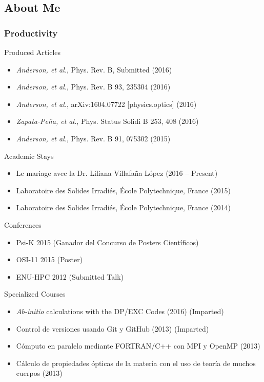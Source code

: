 \documentclass{beamer}
\begin{document}

\subsection{About Me}

\begin{frame}
\frametitle{Productivity}
\begin{block}{Produced Articles}
\begin{itemize}
\item \emph{Anderson, et al.}, Phys. Rev. B, Submitted (2016)
\item \emph{Anderson, et al.}, Phys. Rev. B 93, 235304 (2016)
\item \emph{Anderson, et al.}, arXiv:1604.07722 [physics.optics] (2016)
\item \emph{Zapata-Pe\~na, et al.}, Phys. Status Solidi B 253, 408 (2016) %
\item \emph{Anderson, et al.}, Phys. Rev. B 91, 075302 (2015)
\end{itemize}
\end{block}
\begin{block}{Academic Stays}
\begin{itemize}
\small
\item Le mariage avec la Dr. Liliana Villafa\~na L\'opez (2016 -- Present)
\item Laboratoire des Solides Irradi\'es, \'Ecole Polytechnique, France (2015)
\item Laboratoire des Solides Irradi\'es, \'Ecole Polytechnique, France (2014)
\end{itemize}
\end{block}
\end{frame}

\begin{frame}
\begin{block}{Conferences}
\begin{itemize}
\item Psi-K 2015 (Ganador del Concurso de Posters Cient\'ificos)
\item OSI-11 2015 (Poster)
\item ENU-HPC 2012 (Submitted Talk)
\end{itemize}
\end{block}
\begin{block}{Specialized Courses}
\begin{itemize}
\item \emph{Ab-initio} calculations with the DP/EXC Codes (2016) (Imparted)
\item Control de versiones usando Git y GitHub (2013) (Imparted)
\item C\'omputo en paralelo mediante FORTRAN/C++ con MPI y OpenMP (2013)
\item C\'alculo de propiedades \'opticas de la materia con el uso de teor\'ia de muchos cuerpos (2013)
\end{itemize}
\end{block}
\end{frame}
\end{document}
